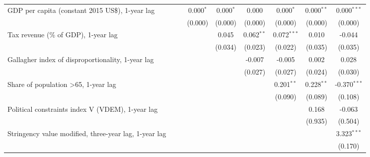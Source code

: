 \begin{table}[htbp]
\begin{tabular}{lcccccccc}
      GDP per capita (constant 2015 US\$), 1-year lag                        &         &         & 0.000$^{*}$ & 0.000$^{*}$ & 0.000         & 0.000$^{*}$   & 0.000$^{**}$   & 0.000$^{***}$\\   
                                                                             &         &         & (0.000)     & (0.000)     & (0.000)       & (0.000)       & (0.000)        & (0.000)\\   
      Tax revenue (\% of GDP), 1-year lag                                    &         &         &             & 0.045       & 0.062$^{**}$  & 0.072$^{***}$ & 0.010          & -0.044\\   
                                                                             &         &         &             & (0.034)     & (0.023)       & (0.022)       & (0.035)        & (0.035)\\   
      Gallagher index of disproportionality, 1-year lag                      &         &         &             &             & -0.007        & -0.005        & 0.002          & 0.028\\   
                                                                             &         &         &             &             & (0.027)       & (0.027)       & (0.024)        & (0.030)\\   
      Share of population >65, 1-year lag                                    &         &         &             &             &               & 0.201$^{**}$  & 0.228$^{**}$   & -0.370$^{***}$\\   
                                                                             &         &         &             &             &               & (0.090)       & (0.089)        & (0.108)\\   
      Political constraints index V (VDEM), 1-year lag                       &         &         &             &             &               &               & 0.168          & -0.063\\   
                                                                             &         &         &             &             &               &               & (0.935)        & (0.504)\\   
      Stringency value modified, three-year lag, 1-year lag                  &         &         &             &             &               &               &                & 3.323$^{***}$\\   
                                                                             &         &         &             &             &               &               &                & (0.170)\\   

\end{tabular}
\end{table}
